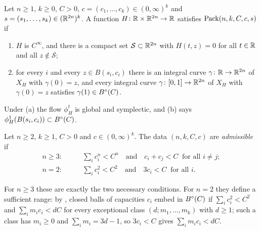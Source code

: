 \begin{definition}\label{def:intro-spec}
Let $n\ge1$, $k\ge0$, $C>0$, $c=(c_1,\dots,c_k)\in(0,\infty)^k$ and $s=(s_1,\dots,s_k)\in(\mathbb{R}^{2n})^k$. A
function $H\colon\mathbb{R}\times\mathbb{R}^{2n}\to\mathbb{R}$ satisfies $\mathrm{Pack}(n,k,C,c,s)$ if
\begin{enumerate}[label=(\alph*)]
\item $H$ is $C^\infty$, and there is a compact set $\mathcal S\subset\mathbb{R}^{2n}$ with $H(t,z)=0$ for all
 $t\in\mathbb{R}$ and all $z\notin\mathcal S$;
\item for every $i$ and every $z\in B(s_i,c_i)$ there is an integral curve $\gamma\colon\mathbb{R}\to\mathbb{R}^{2n}$ of
 $X_H$ with $\gamma(0)=z$, and every integral curve $\gamma\colon[0,1]\to\mathbb{R}^{2n}$ of $X_H$ with
 $\gamma(0)=z$ satisfies $\gamma(1)\in B^{\circ}(C)$.
\end{enumerate}
\end{definition}

Under (a) the flow $\phi^t_H$ is global and symplectic, and (b) says $\phi^1_H(B(s_i,c_i))\subset B^{\circ}(C)$.

\begin{definition}\label{def:intro-admissible}
Let $n\ge2$, $k\ge1$, $C>0$ and $c\in(0,\infty)^k$. The data $(n,k,C,c)$ are \emph{admissible} if
\begin{align*}
 n\ge3:&\qquad \textstyle\sum_ic_i^n<C^n\quad\text{and}\quad c_i+c_j<C\ \text{ for all } i\ne j;\\
 n=2:&\qquad \textstyle\sum_ic_i^2<C^2\quad\text{and}\quad 3c_i<C\ \text{ for all } i.
\end{align*}
\end{definition}

For $n\ge3$ these are exactly the two necessary conditions. For $n=2$ they define a sufficient range: by \cite{McDuffPolterovich1994,McDuff1998,LiLiu2001,LiLi2002}, closed balls of capacities
$c_i$ embed in $B^{\circ}(C)$ if $\sum_ic_i^2<C^2$ and $\sum_im_ic_i<dC$ for every exceptional class $(d;m_1,\dots,m_k)$
with $d\ge1$; such a class has $m_i\ge0$ and $\sum_im_i=3d-1$, so $3c_i<C$ gives $\sum_im_ic_i<dC$.


